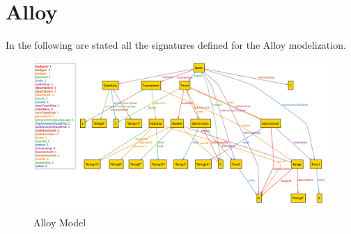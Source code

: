 \section{Alloy}

In the following are stated all the signatures defined for the Alloy modelization.
\vspace{0.5 cm}


\vspace{2cm}

\begin{figure}[h]
    \centering
    \includegraphics[width=\textwidth]{src/Alloy-model.png}
    \caption*{Alloy Model}
\end{figure} \vspace{0.5cm}